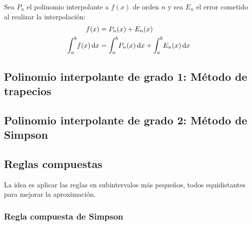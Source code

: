 \documentclass[]{article}
\begin{document}
Sea $P_n$ el polinomio interpolante a $f(x)$ de orden $n$ y sea $E_n$ el error cometido al realizar la interpolación:
\begin{align*}
	f(x) &= P_n(x) + E_n(x) \\
	\int_{a}^{b} \! f(x) \, \mathrm{d}x &= \int_{a}^{b} \! P_n(x) \, \mathrm{d}x + \int_{a}^{b} \! E_n(x) \, \mathrm{d}x
\end{align*}

\subsection{Polinomio interpolante de grado 1: Método de trapecios}



\subsection{Polinomio interpolante de grado 2: Método de Simpson}

\subsection{Reglas compuestas}
La idea es aplicar las reglas en subintervalos más pequeños, todos equidistantes para mejorar la aproximación.

\subsubsection{Regla compuesta de Simpson}
\end{document}

